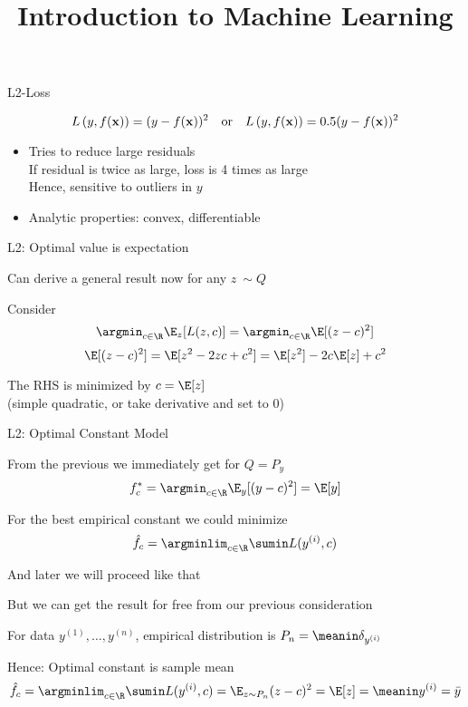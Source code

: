 \documentclass[11pt,compress,t,notes=noshow, xcolor=table]{beamer}
\title{Introduction to Machine Learning}
\begin{document}
    

\begin{frame}{L2-Loss}

$$
L\left(y, f(\mathbf{x})\right) = (y-f(\mathbf{x}))^2 \quad \text{or} \quad L\left(y, f(\mathbf{x})\right) = 0.5 (y-f(\mathbf{x}))^2
$$

\vfill

\begin{itemize}
\item Tries to reduce large residuals \\
If residual is twice as large, loss is 4 times as large\\
Hence, sensitive to outliers in $y$
\item Analytic properties: convex, differentiable 
\end{itemize}


\end{frame}


\begin{framei}[sep=L]{L2: Optimal value is expectation}

\item Can derive a general result now for any $z ~ \sim Q$
\item Consider 
$$ \argmin_{c \in \R}  \E_{z} [L(z, c)] = \argmin_{c \in \R}  \E [(z - c)^2] $$
$$\E [(z - c)^2] =  \E [z^2 - 2zc + c^2 ] = \E[z^2] -2c\E[z] + c^2   $$

\item The RHS is minimized by $c = \E[z]$\\
(simple quadratic, or take derivative and set to 0)

\end{framei}


\begin{framei}[sep=S]{L2: Optimal Constant Model}

\item From the previous we immediately get for $Q = P_y$
$$
f_{c}^{\ast} = \argmin_{c \in \R} \E_{y} [ (y - c)^2 ] = \E[y]
$$
\item For the best empirical constant we could minimize   
$$\hat{f}_c = \argminlim_{c \in \R} \sumin L(\yi,c)$$

And later we will proceed like that
\item But we can get the result for free from our previous consideration
  
\item For data $y^{(1)}, \ldots, y^{(n)}$, empirical distribution is $P_n = \meanin \delta_{\yi}$

\item Hence: Optimal constant is sample mean
$$\hat{f}_c = \argminlim_{c \in \R} \sumin L(\yi,c) = 
\E_{z \sim P_n} (z-c)^2 = \E[z] = \meanin \yi = \bar{y}
$$

\end{framei}
\end{document}
